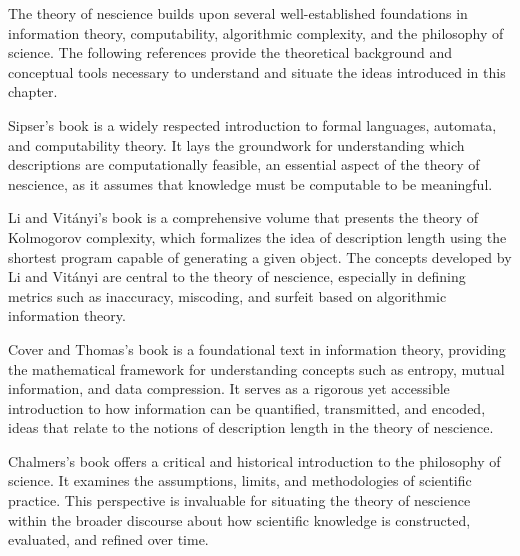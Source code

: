 The theory of nescience builds upon several well-established foundations in information theory, computability, algorithmic complexity, and the philosophy of science. The following references provide the theoretical background and conceptual tools necessary to understand and situate the ideas introduced in this chapter.
 
Sipser's book \cite{sipser2012introduction} is a widely respected introduction to formal languages, automata, and computability theory. It lays the groundwork for understanding which descriptions are computationally feasible, an essential aspect of the theory of nescience, as it assumes that knowledge must be computable to be meaningful.

Li and Vitányi's book \cite{li2013introduction} is a comprehensive volume that presents the theory of Kolmogorov complexity, which formalizes the idea of description length using the shortest program capable of generating a given object. The concepts developed by Li and Vitányi are central to the theory of nescience, especially in defining metrics such as inaccuracy, miscoding, and surfeit based on algorithmic information theory.

Cover and Thomas's book \cite{cover2012elements} is a foundational text in information theory, providing the mathematical framework for understanding concepts such as entropy, mutual information, and data compression. It serves as a rigorous yet accessible introduction to how information can be quantified, transmitted, and encoded, ideas that relate to the notions of description length in the theory of nescience.

Chalmers's book \cite{chalmers2013thing} offers a critical and historical introduction to the philosophy of science. It examines the assumptions, limits, and methodologies of scientific practice. This perspective is invaluable for situating the theory of nescience within the broader discourse about how scientific knowledge is constructed, evaluated, and refined over time.
